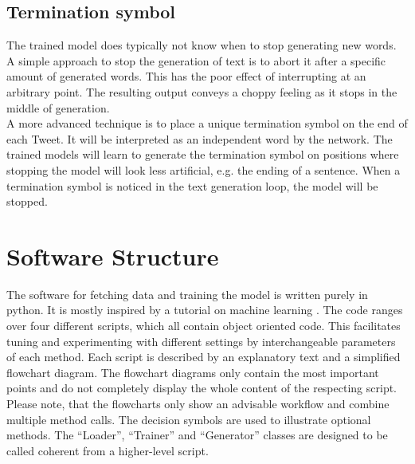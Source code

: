 \documentclass[conference]{IEEEtran}
\begin{document}
\subsection{Termination symbol}

The trained model does typically not know when to stop generating new words. A simple approach to stop the generation of text is to abort it after a specific amount of generated words. This has the poor effect of interrupting at an arbitrary point. The resulting output conveys a choppy feeling as it stops in the middle of generation.\\
A more advanced technique is to place a unique termination symbol on the end of each Tweet. It will be interpreted as an independent word by the network. The trained models will learn to generate the termination symbol on positions where stopping the model will look less artificial, e.g. the ending of a sentence. When a termination symbol is noticed in the text generation loop, the model will be stopped.

%

\section{Software Structure}

The software for fetching data and training the model is written purely in python. It is mostly inspired by a tutorial on machine learning \cite{tutrob}. The code ranges over four different scripts, which all contain object oriented code. This facilitates tuning and experimenting with different settings by interchangeable parameters of each method. Each script is described by an explanatory text and a simplified flowchart diagram. The flowchart diagrams only contain the most important points and do not completely display the whole content of the respecting script. Please note, that the flowcharts only show an advisable workflow and combine multiple method calls. The decision symbols are used to illustrate optional methods. The ``Loader'', ``Trainer'' and ``Generator'' classes are designed to be called coherent from a higher-level script.
\end{document}

